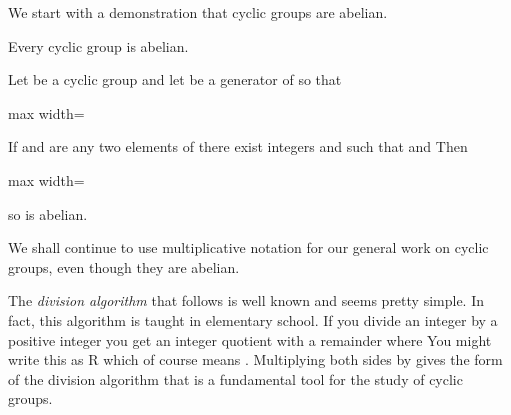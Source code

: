 \documentclass[11pt,oneside]{article}
\begin{document}
\begin{BookBody}

\noindent We start with a demonstration that cyclic groups are abelian.

 Every cyclic group is abelian.

 Let  be a cyclic group and let  be a generator of  so that

\begin{center}\begin{adjustbox}{max width=\linewidth}\end{adjustbox}\end{center}

\noindent If  and  are any two elements of  there exist integers  and  such that  and  Then

\begin{center}\begin{adjustbox}{max width=\linewidth}\end{adjustbox}\end{center}

\noindent so  is abelian. \BookEnd{\blacklozenge}

We shall continue to use multiplicative notation for our general work on cyclic groups, even though they are abelian.

The\textit{ division algorithm} that follows is well known and seems pretty simple. In fact, this algorithm is taught in elementary school. If you divide an integer  by a positive integer  you get an integer quotient  with a remainder  where  You might write this as  R  which of course means . Multiplying both sides by  gives the form of the division algorithm that is a fundamental tool for the study of cyclic groups.

\end{BookBody}
\end{document}

